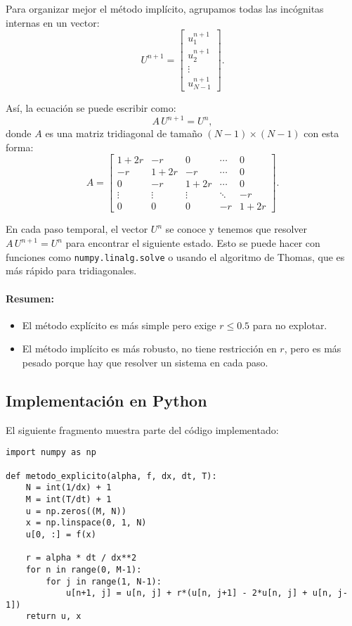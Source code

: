 \documentclass[12pt,a4paper]{article}
\begin{document}
Para organizar mejor el método implícito, agrupamos todas las incógnitas internas en un vector:
\[
U^{n+1} = \begin{bmatrix} u_1^{n+1} \\ u_2^{n+1} \\ \vdots \\ u_{N-1}^{n+1} \end{bmatrix}.
\]

Así, la ecuación se puede escribir como:
\[
A\,U^{n+1} = U^n,
\]
donde $A$ es una matriz tridiagonal de tamaño $(N-1)\times(N-1)$ con esta forma:
\[
A =
\begin{bmatrix}
1+2r & -r    & 0      & \cdots & 0 \\
-r    & 1+2r & -r     & \cdots & 0 \\
0     & -r    & 1+2r  & \cdots & 0 \\
\vdots& \vdots& \vdots & \ddots & -r \\
0     & 0     & 0      & -r     & 1+2r
\end{bmatrix}.
\]

En cada paso temporal, el vector $U^n$ se conoce y tenemos que resolver $A\,U^{n+1}=U^n$ para encontrar el siguiente estado. Esto se puede hacer con funciones como \texttt{numpy.linalg.solve} o usando el algoritmo de Thomas, que es más rápido para tridiagonales.

\paragraph{Resumen:}  
\begin{itemize}
    \item El método explícito es más simple pero exige $r \leq 0.5$ para no explotar.
    \item El método implícito es más robusto, no tiene restricción en $r$, pero es más pesado porque hay que resolver un sistema en cada paso.
\end{itemize}


\subsection{Implementación en Python}
El siguiente fragmento muestra parte del código implementado:

\begin{lstlisting}
import numpy as np

def metodo_explicito(alpha, f, dx, dt, T):
    N = int(1/dx) + 1
    M = int(T/dt) + 1
    u = np.zeros((M, N))
    x = np.linspace(0, 1, N)
    u[0, :] = f(x)

    r = alpha * dt / dx**2
    for n in range(0, M-1):
        for j in range(1, N-1):
            u[n+1, j] = u[n, j] + r*(u[n, j+1] - 2*u[n, j] + u[n, j-1])
    return u, x
\end{lstlisting}
\end{document}
